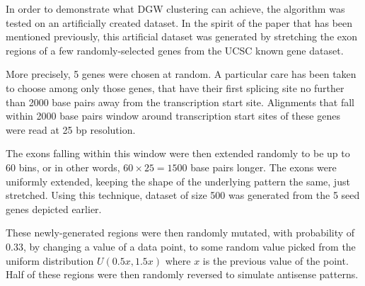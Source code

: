 \documentclass[parskip]{cs4rep}
\begin{document}
In order to demonstrate what DGW clustering can achieve, the algorithm was tested on an artificially created dataset. In the spirit of the paper that has been mentioned previously, this artificial dataset was generated by  stretching the exon regions of a few randomly-selected genes from the UCSC known gene dataset.

More precisely, 5 genes were chosen at random. A particular care has been taken to choose among only those genes, that have their first splicing site no further than 2000 base pairs away from the transcription start site. Alignments that fall within 2000 base pairs window around transcription start sites of these genes were read at 25 bp resolution.

The exons falling within this window were then extended randomly to be up to 60 bins, or in other words, $60 \times 25=1500$ base pairs longer. The exons were uniformly extended, keeping the shape of the underlying pattern the same, just stretched. Using this technique, dataset of size 500 was generated from the 5 seed genes depicted earlier.

These newly-generated regions were then randomly mutated, with probability of $0.33$, by changing a value of a data point, to some random value picked from the uniform distribution $U(0.5x, 1.5x)$ where $x$ is the previous value of the point. Half of these regions were then randomly reversed to simulate antisense patterns.
\end{document}
